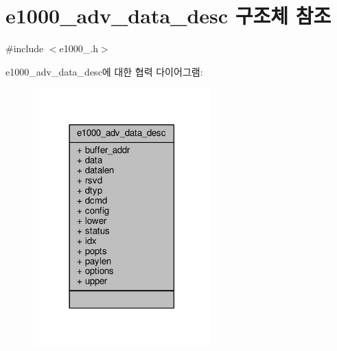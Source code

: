 \hypertarget{structe1000__adv__data__desc}{}\section{e1000\+\_\+adv\+\_\+data\+\_\+desc 구조체 참조}
\label{structe1000__adv__data__desc}


{\ttfamily \#include $<$e1000\+\_.\+h$>$}



e1000\+\_\+adv\+\_\+data\+\_\+desc에 대한 협력 다이어그램\+:
\nopagebreak
\begin{figure}[H]
\begin{center}
\leavevmode
\includegraphics[width=194pt]{structe1000__adv__data__desc__coll__graph}
\end{center}
\end{figure}
